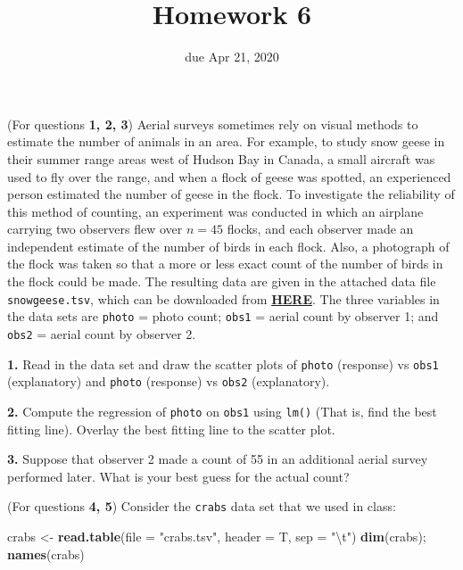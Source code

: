 \documentclass[]{article}
\title{Homework 6}
\subtitle{due Apr 21, 2020}
\author{}
\date{\vspace{-2.5em}}
\newenvironment{Shaded}{\begin{snugshade}}{\end{snugshade}}
\newcommand{\CharTok}[1]{\textcolor[rgb]{0.31,0.60,0.02}{#1}}
\newcommand{\DataTypeTok}[1]{\textcolor[rgb]{0.13,0.29,0.53}{#1}}
\newcommand{\KeywordTok}[1]{\textcolor[rgb]{0.13,0.29,0.53}{\textbf{#1}}}
\newcommand{\NormalTok}[1]{#1}
\newcommand{\StringTok}[1]{\textcolor[rgb]{0.31,0.60,0.02}{#1}}
\begin{document}
\maketitle

(For questions \textbf{1, 2, 3}) Aerial surveys sometimes rely on visual
methods to estimate the number of animals in an area. For example, to
study snow geese in their summer range areas west of Hudson Bay in
Canada, a small aircraft was used to fly over the range, and when a
flock of geese was spotted, an experienced person estimated the number
of geese in the flock. To investigate the reliability of this method of
counting, an experiment was conducted in which an airplane carrying two
observers flew over \(n=45\) flocks, and each observer made an
independent estimate of the number of birds in each flock. Also, a
photograph of the flock was taken so that a more or less exact count of
the number of birds in the flock could be made. The resulting data are
given in the attached data file \texttt{snowgeese.tsv}, which can be
downloaded from
\href{https://junglee0713.netlify.com/snowgeese.tsv}{\textbf{HERE}}. The
three variables in the data sets are \texttt{photo} = photo count;
\texttt{obs1} = aerial count by observer 1; and \texttt{obs2} = aerial
count by observer 2.

\bigskip

\textbf{1.} Read in the data set and draw the scatter plots of
\texttt{photo} (response) vs \texttt{obs1} (explanatory) and
\texttt{photo} (response) vs \texttt{obs2} (explanatory).

\bigskip

\textbf{2.} Compute the regression of \texttt{photo} on \texttt{obs1}
using \texttt{lm()} (That is, find the best fitting line). Overlay the
best fitting line to the scatter plot.

\bigskip

\textbf{3.} Suppose that observer 2 made a count of 55 in an additional
aerial survey performed later. What is your best guess for the actual
count?

\bigskip

(For questions \textbf{4, 5}) Consider the \texttt{crabs} data set that
we used in class:

\begin{Shaded}
\begin{Highlighting}[]
\NormalTok{crabs <-}\StringTok{ }\KeywordTok{read.table}\NormalTok{(}\DataTypeTok{file =} \StringTok{"crabs.tsv"}\NormalTok{, }\DataTypeTok{header =}\NormalTok{ T, }\DataTypeTok{sep =} \StringTok{"}\CharTok{\textbackslash{}t}\StringTok{"}\NormalTok{)}
\KeywordTok{dim}\NormalTok{(crabs); }\KeywordTok{names}\NormalTok{(crabs)}
\end{Highlighting}
\end{Shaded}
\end{document}
